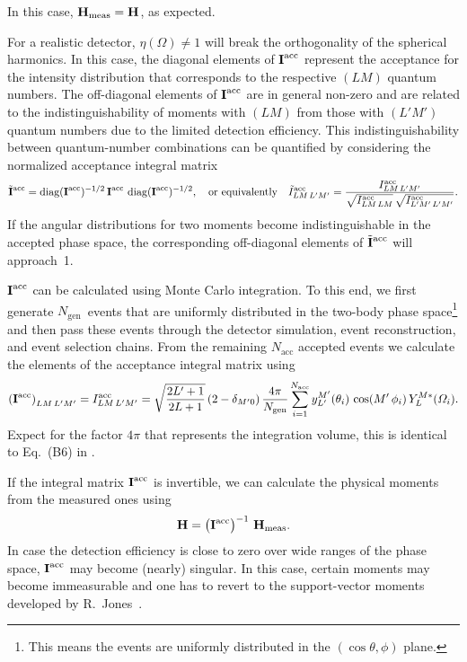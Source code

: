 In this case, $\bm{\mathrm{H}}_\text{meas} = \bm{\mathrm{H}}$, as expected.

For a realistic detector, $\eta(\Omega) \neq 1$ will break the
orthogonality of the spherical harmonics.  In this case, the diagonal
elements of $\bm{\mathrm{I}}^\text{acc}$ represent the acceptance for the
intensity distribution that corresponds to the respective $(L M)$
quantum numbers.  The off-diagonal elements of $\bm{\mathrm{I}}^\text{acc}$
are in general non-zero and are related to the indistinguishability of
moments with $(L M)$ from those with $(L' M')$ quantum numbers due to
the limited detection efficiency.  This indistinguishability between
quantum-number combinations can be quantified by considering the
normalized acceptance integral matrix
\begin{equation}
  \tilde{\bm{\mathrm{I}}}^\text{acc}
  = \operatorname{diag}(\bm{\mathrm{I}}^\text{acc})^{-1/2}\, \bm{\mathrm{I}}^\text{acc}\, \operatorname{diag}(\bm{\mathrm{I}}^\text{acc})^{-1/2},
  \quad\text{or equivalently}\quad
  \tilde{I}^\text{acc}_{L M\, L' M'}
  = \frac{I^\text{acc}_{L M\, L' M'}}{\sqrt{I^\text{acc}_{L M\, L M}}\, \sqrt{I^\text{acc}_{L' M'\, L' M'}}}.
\end{equation}
If the angular distributions for two moments become indistinguishable
in the accepted phase space, the corresponding off-diagonal elements
of $\tilde{\bm{\mathrm{I}}}^\text{acc}$ will approach~1.

$\bm{\mathrm{I}}^\text{acc}$ can be calculated using Monte Carlo
integration.  To this end, we first generate $N_\text{gen}$~events
that are uniformly distributed in the two-body phase
space\footnote{This means the events are uniformly distributed in the
$(\cos\theta, \phi)$ plane.} and then pass these events through the
detector simulation, event reconstruction, and event selection chains.
From the remaining $N_\text{acc}$ accepted events we calculate the
elements of the acceptance integral matrix using
\begin{equation}
  \label{eq:diffraction_integral_matrix}
  \rBrk{\mat{I}^\text{acc}}_{L M\, L' M'}
  = I^\text{acc}_{L M\, L' M'}
  = \sqrt{\frac{2 L' + 1}{2 L + 1}}\, (2 - \delta_{M' 0})\,
  \frac{4 \pi}{N_\text{gen}} \sum_{i = 1}^{N_\text{acc}} y_{L'}^{M'}(\theta_i)\, \cos(M'\, \phi_i)\, Y_L^{M *}(\Omega_i).
\end{equation}
Expect for the factor $4 \pi$ that represents the integration volume,
this is identical to Eq.~(B6) in .

If the integral matrix $\bm{\mathrm{I}}^\text{acc}$ is invertible, we can
calculate the physical moments from the measured ones using
\begin{equation}
  \label{eq:diffraction_phys_moments}
  \vect{H}
  = \rBrk[1]{\mat{I}^\text{acc}}^{-1}\, \vect{H}_\text{meas}.
\end{equation}
In case the detection efficiency is close to zero over wide ranges of
the phase space, $\bm{\mathrm{I}}^\text{acc}$ may become (nearly) singular.
In this case, certain moments may become immeasurable and one has to
revert to the support-vector moments developed by
R.~Jones~\cite{Jones:2023}.


